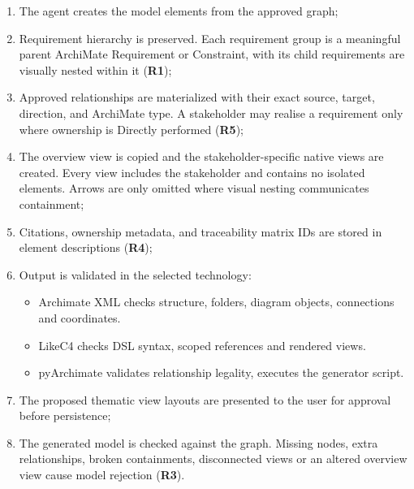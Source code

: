 \begin{enumerate}
    \item The agent creates the model elements from the approved graph;
    \item Requirement hierarchy is preserved. Each requirement group is a meaningful parent ArchiMate Requirement or Constraint, with its child requirements are visually nested within it (\textbf{R1});
    \item Approved relationships are materialized with their exact source, target, direction, and ArchiMate type. A stakeholder may realise a requirement only where ownership is Directly performed (\textbf{R5});
    \item The overview view is copied and the stakeholder-specific native views are created. Every view includes the stakeholder and contains no isolated elements. Arrows are only omitted where visual nesting communicates containment;
    \item Citations, ownership metadata, and traceability matrix \ac{ID}s are stored in element descriptions (\textbf{R4});
    \item Output is validated in the selected technology:
    \begin{itemize}
        \item Archimate \ac{XML} checks structure, folders, diagram objects, connections and coordinates.
        \item LikeC4 checks \ac{DSL} syntax, scoped references and rendered views.
        \item pyArchimate validates relationship legality, executes the generator script.
    \end{itemize}
    \item The proposed thematic view layouts are presented to the user for approval before persistence;
    \item The generated model is checked against the graph. Missing nodes, extra relationships, broken containments, disconnected views or an altered overview view cause model rejection (\textbf{R3}).
\end{enumerate}

